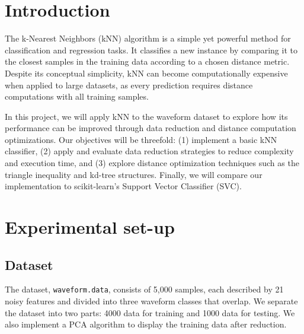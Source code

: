 \documentclass{article}
\theoremstyle{plain}
\theoremstyle{definition}
\theoremstyle{remark}
\begin{document}
\begin{abstract}
This project aims to study the k-Nearest Neighbors (kNN) algorithm applied to waveform classification and to evaluate how data reduction and distance optimization techniques affect its performance. We first implemented a basic version of kNN to establish a baseline, which achieved an accuracy close to 86 \%. Then, we applied two data reduction methods to simplify the training set. These methods significantly decreased execution time (up to 14 times faster) while maintaining similar accuracy levels. Finally, we compared our implementation with scikit-learn's Support Vector Classifier (SVC) \cite{CortesVapnik1995} to evaluate performance differences. Our results show that data reduction can effectively speed up computation without substantially sacrificing accuracy, while distance optimization methods showed limited impact.
\end{abstract}

\section{Introduction}
\label{intro}

The k-Nearest Neighbors (kNN) algorithm is a simple yet powerful method for classification and regression tasks. It classifies a new instance by comparing it to the closest samples in the training data according to a chosen distance metric. Despite its conceptual simplicity, kNN can become computationally expensive when applied to large datasets, as every prediction requires distance computations with all training samples.

In this project, we will apply kNN to the waveform dataset to explore how its performance can be improved through data reduction and distance computation optimizations. Our objectives will be threefold: (1) implement a basic kNN classifier, (2) apply and evaluate data reduction strategies to reduce complexity and execution time, and (3) explore distance optimization techniques such as the triangle inequality and kd-tree structures. Finally, we will compare our implementation to scikit-learn's Support Vector Classifier (SVC).

\section{Experimental set-up}

\subsection{Dataset}
The dataset, \verb|waveform.data|, consists of 5,000 samples, each described by 21 noisy features and divided into three waveform classes that overlap. We separate the dataset into two parts: 4000 data for training and 1000 data for testing. We also implement a PCA \cite{Hotelling1933} algorithm to display the training data after reduction.
\end{document}

